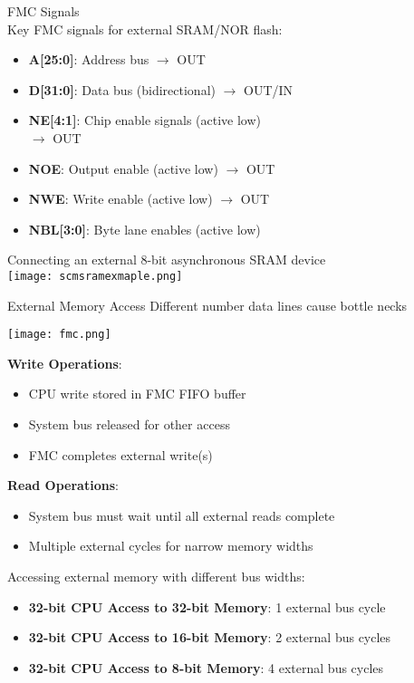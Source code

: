 \begin{definition}{FMC Signals}\\
Key FMC signals for external SRAM/NOR flash:
\begin{itemize}
    \item \textbf{A[25:0]}: Address bus $\rightarrow$ OUT
    \item \textbf{D[31:0]}: Data bus (bidirectional) $\rightarrow$ OUT/IN
    \item \textbf{NE[4:1]}: Chip enable signals (active low) \\ $\rightarrow$ OUT
    \item \textbf{NOE}: Output enable (active low) $\rightarrow$ OUT
    \item \textbf{NWE}: Write enable (active low) $\rightarrow$ OUT
    \item \textbf{NBL[3:0]}: Byte lane enables (active low)
\end{itemize}

\end{definition}

\multend

\begin{example2}{Connecting an external 8-bit asynchronous SRAM device}\\
    \texttt{[image: scmsramexmaple.png]}
\end{example2}

\begin{concept}{External Memory Access}
    Different number data lines cause bottle necks

\begin{minipage}{0.4\linewidth}
\texttt{[image: fmc.png]}
\end{minipage}
\begin{minipage}{0.6\linewidth}
\textbf{Write Operations}:
\begin{itemize}
    \item CPU write stored in FMC FIFO buffer
    \item System bus released for other access
    \item FMC completes external write(s)
\end{itemize}
\textbf{Read Operations}:
\begin{itemize}
    \item System bus must wait until all external reads complete
    \item Multiple external cycles for narrow memory widths
\end{itemize}
Accessing external memory with different bus widths:
\begin{itemize}
    \item \textbf{32-bit CPU Access to 32-bit Memory}: 1 external bus cycle
    \item \textbf{32-bit CPU Access to 16-bit Memory}: 2 external bus cycles
    \item \textbf{32-bit CPU Access to 8-bit Memory}: 4 external bus cycles
\end{itemize}
\end{minipage}
\end{concept}

